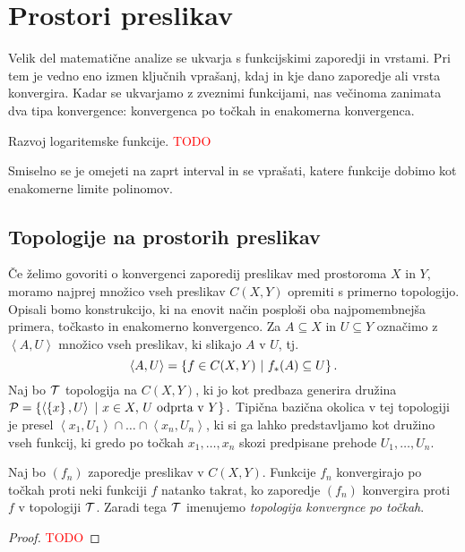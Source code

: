 \section{Prostori preslikav}
Velik del matematične analize se ukvarja s funkcijskimi zaporedji in vrstami. Pri tem je vedno eno izmen ključnih vprašanj, kdaj in kje dano zaporedje ali vrsta konvergira. Kadar se ukvarjamo z zveznimi funkcijami, nas večinoma zanimata dva tipa konvergence: konvergenca po točkah in enakomerna konvergenca.

\begin{primer}
    Razvoj logaritemske funkcije. \textcolor{red}{TODO}

    Smiselno se je omejeti na zaprt interval in se vprašati, katere funkcije dobimo kot enakomerne limite polinomov.
\end{primer}

\subsection{Topologije na prostorih preslikav}
Če želimo govoriti o konvergenci zaporedij preslikav med prostoroma $X$ in $Y$, moramo najprej množico vseh preslikav \(C(X, Y)\) opremiti s primerno topologijo. Opisali bomo konstrukcijo, ki na enovit način posploši oba najpomembnejša primera, točkasto in enakomerno konvergenco. Za \(A \subseteq X\) in \(U \subseteq Y\) označimo z $\left\langle A, U\right\rangle$ množico vseh preslikav, ki slikajo $A$ v $U$, tj. 
$$\left\langle A, U \right\rangle = \left\{f \in C(X,Y) \ | \ f_{*}(A) \subseteq U\right\}.$$
Naj bo $\mathcal{T}$ topologija na $C(X, Y)$, ki jo kot predbaza generira družina \(\mathcal{P} = \left\{\left\langle \left\{x\right\}, U \right\rangle \ | \ x \in X, \, U \text{ odprta v } Y\right\}.\) Tipična bazična okolica v tej topologiji je presel $\left\langle x_1, U_1 \right\rangle \cap \ldots \cap \left\langle x_n, U_n \right\rangle$, ki si ga lahko predstavljamo kot družino vseh funkcij, ki gredo po točkah $x_1, \ldots, x_n$ skozi predpisane prehode $U_1, \ldots, U_n$.

\begin{trditev}
    Naj bo \((f_n)\) zaporedje preslikav v \(C(X, Y)\). Funkcije \(f_n\) konvergirajo po točkah proti neki funkciji $f$ natanko takrat, ko zaporedje \((f_n)\) konvergira proti $f$ v topologiji $\mathcal{T}$. Zaradi tega \(\mathcal{T}\) imenujemo \emph{topologija konvergnce po točkah}.
\end{trditev}

\begin{proof}
    \textcolor{red}{TODO}
\end{proof}

